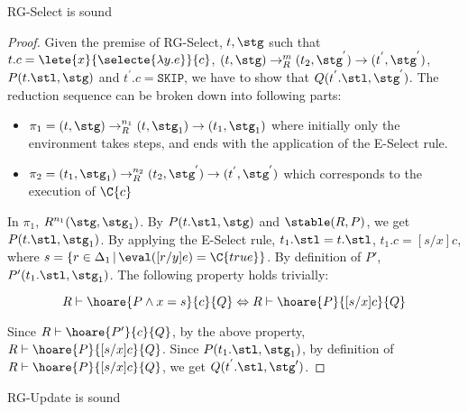 \begin{theorem}
RG-Select is sound
\end{theorem}

\begin{proof}
Given the premise of RG-Select, $t, \stg$ such that $t.c = \lete{x}{\selecte{\lambda y.e}}{c}$, $(t, \stg) \rightarrow_{R}^{m} (t_2, \stg^{'}) \rightarrow (t^{'}, \stg^{'})$, $P(t.\stl, \stg)$ and $t^{'}.c = \texttt{SKIP}$, we have to show that $Q(t^{'}.\stl, \stg^{'})$. The reduction sequence can be broken down into following parts:

\begin{itemize}
\item $\pi_1 = (t, \stg) \rightarrow_{R}^{n_1} (t, \stg_1) \rightarrow (t_1, \stg_1)$ where initially only the environment takes steps, and ends with the application of the E-Select rule.
\item $\pi_2 = (t_1, \stg_1) \rightarrow_{R}^{n_2} (t_2, \stg^{'}) \rightarrow (t^{'}, \stg^{'}) $ which corresponds to the execution of $\C{c}$
\end{itemize}

In $\pi_1$, $R^{n_1}(\stg, \stg_1)$. By $P(t.\stl, \stg)$ and $\stable(R, P)$, we get $P(t.\stl, \stg_1)$. By applying the E-Select rule, $t_1.\stl = t.\stl$, $t_1.c = [s/x]c$, where $s = \{r\in\Delta_1 \,|\, \eval([r/y]e)=\C{true}\}$. By definition of $P'$, $P'(t_1.\stl, \stg_1)$. The following property holds trivially:

$$
R \vdash \hoare{P \wedge x = s} {c} {Q} \Leftrightarrow R \vdash \hoare{P} {[s/x]c} {Q}
$$

Since $R \vdash \hoare{P'}{c}{Q}$, by the above property, $R \vdash \hoare{P}{[s/x]c}{Q}$. Since $P(t_1.\stl, \stg_1)$, by definition of $R \vdash \hoare{P}{[s/x]c}{Q}$, we get $Q(t^{'}.\stl, \stg')$.


\end{proof}

\begin{theorem}
RG-Update is sound
\end{theorem}

